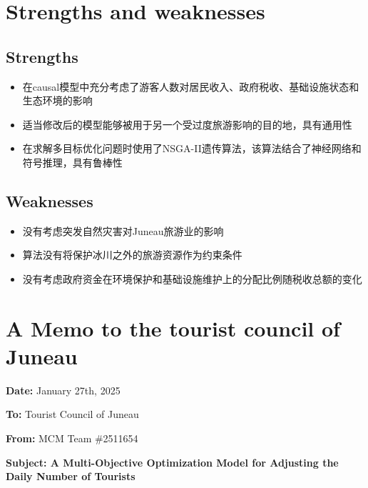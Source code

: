 \documentclass[12pt]{article}  %
\begin{document}
 \section{Strengths and weaknesses}
 
 \subsection{Strengths}
 
 \begin{itemize}
     \setlength{\parsep}{0ex} %
     \setlength{\topsep}{2ex} %
     \setlength{\itemsep}{1ex} %
     \item 在causal模型中充分考虑了游客人数对居民收入、政府税收、基础设施状态和生态环境的影响
     \item 适当修改后的模型能够被用于另一个受过度旅游影响的目的地，具有通用性
     \item 在求解多目标优化问题时使用了NSGA-II遗传算法，该算法结合了神经网络和符号推理，具有鲁棒性	
 \end{itemize}
 
 \subsection{Weaknesses}

 \begin{itemize}
    \setlength{\parsep}{0ex} %
     \setlength{\topsep}{2ex} %
     \setlength{\itemsep}{1ex} %
      \item 没有考虑突发自然灾害对Juneau旅游业的影响
      \item 算法没有将保护冰川之外的旅游资源作为约束条件
      \item 没有考虑政府资金在环境保护和基础设施维护上的分配比例随税收总额的变化
 \end{itemize}
 
 
 \clearpage
 \section{A Memo to the tourist council of Juneau}
 \noindent
 \textbf{Date:} January 27th, 2025

 \noindent
 \textbf{To:} Tourist Council of Juneau

 \noindent
 \textbf{From:} MCM Team \#2511654

 \noindent
 \textbf{Subject: A Multi-Objective Optimization Model for Adjusting the Daily Number of Tourists}
 
\end{document}
